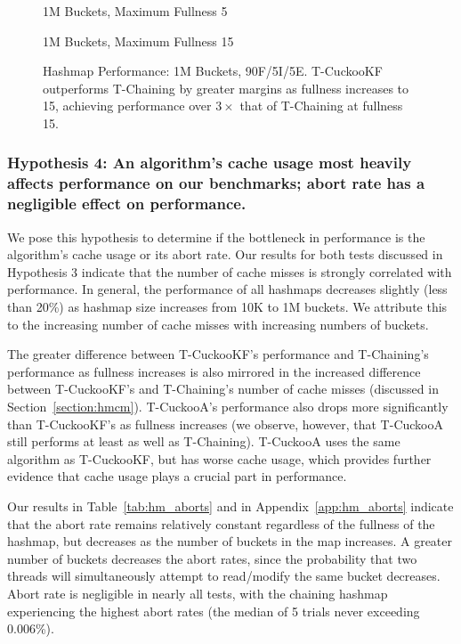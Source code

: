 \begin{figure}[H]
    \centering
    \begin{minipage}{0.75\textwidth}
    \caption*{1M Buckets, Maximum Fullness 5}
        \vspace{12pt}
    \end{minipage}
   \begin{minipage}{0.75\textwidth}
    \caption*{1M Buckets, Maximum Fullness 15}
        \vspace{12pt}
    \end{minipage}
	\caption[Hashmap Performance: 1M Buckets, 90F/5I/5E]{Hashmap Performance: 1M Buckets, 90F/5I/5E. T-CuckooKF outperforms T-Chaining by greater margins as fullness increases to 15, achieving performance over $3\times$ that of T-Chaining at fullness 15.}
    \label{fig:hm_90_3}
\end{figure}


\subsubsection{Hypothesis 4: An algorithm's cache usage most heavily affects performance on our benchmarks; abort rate has a negligible effect on performance.}

    We pose this hypothesis to determine if the bottleneck in performance is the algorithm's cache usage or its abort rate. 
Our results for both tests discussed in Hypothesis 3 indicate that the number of cache misses is strongly correlated with performance. In general, the performance of all hashmaps decreases slightly (less than 20\%) as hashmap size increases from 10K to 1M buckets. We attribute this to the increasing number of cache misses with increasing numbers of buckets.

The greater difference between T-CuckooKF's performance and T-Chaining's performance as fullness increases is also mirrored in the increased difference between T-CuckooKF's and T-Chaining's number of cache misses (discussed in Section~\ref{section:hmcm}). T-CuckooA's performance also drops more significantly than T-CuckooKF's as fullness increases (we observe, however, that T-CuckooA still performs at least as well as T-Chaining). T-CuckooA uses the same algorithm as T-CuckooKF, but has worse cache usage, which provides further evidence that cache usage plays a crucial part in performance. 

    Our results in Table~\ref{tab:hm_aborts} and in Appendix~\ref{app:hm_aborts} indicate that the abort rate remains relatively constant regardless of the fullness of the hashmap, but decreases as the number of buckets in the map increases. A greater number of buckets decreases the abort rates, since the probability that two threads will simultaneously attempt to read/modify the same bucket decreases. Abort rate is negligible in nearly all tests, with the chaining hashmap experiencing the highest abort rates (the median of 5 trials never exceeding 0.006\%).


